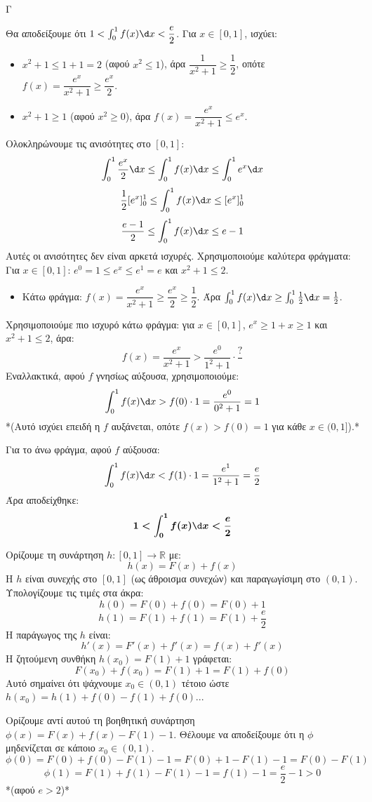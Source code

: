 \begin{thema}{Γ}
\begin{erwthma}
\item Θα αποδείξουμε ότι $1 < \int_0^1 f(x)\d x < \dfrac{e}{2}$.
Για $x \in [0, 1]$, ισχύει:
\begin{itemize}
    \item $x^2 + 1 \le 1 + 1 = 2$ (αφού $x^2 \le 1$), άρα $\dfrac{1}{x^2+1} \ge \dfrac{1}{2}$, οπότε $f(x) = \dfrac{e^x}{x^2+1} \ge \dfrac{e^x}{2}$.
    \item $x^2 + 1 \ge 1$ (αφού $x^2 \ge 0$), άρα $f(x) = \dfrac{e^x}{x^2+1} \le e^x$.
\end{itemize}
Ολοκληρώνουμε τις ανισότητες στο $[0,1]$:
\[ \int_0^1 \frac{e^x}{2} \d x \le \int_0^1 f(x) \d x \le \int_0^1 e^x \d x \]
\[ \frac{1}{2}[e^x]_0^1 \le \int_0^1 f(x) \d x \le [e^x]_0^1 \]
\[ \frac{e-1}{2} \le \int_0^1 f(x) \d x \le e - 1 \]
Αυτές οι ανισότητες δεν είναι αρκετά ισχυρές. Χρησιμοποιούμε καλύτερα φράγματα:
Για $x \in [0,1]$: $e^0 = 1 \le e^x \le e^1 = e$ και $x^2+1 \le 2$.
\begin{itemize}
    \item Κάτω φράγμα: $f(x) = \dfrac{e^x}{x^2+1} \ge \dfrac{e^x}{2} \ge \dfrac{1}{2}$. Άρα $\int_0^1 f(x)\d x \ge \int_0^1 \frac{1}{2}\d x = \frac{1}{2}$.
\end{itemize}
Χρησιμοποιούμε πιο ισχυρό κάτω φράγμα: για $x \in [0,1]$, $e^x \ge 1 + x \ge 1$ και $x^2 + 1 \le 2$, άρα:
\[ f(x) = \frac{e^x}{x^2+1} > \frac{e^0}{1^2+1} \cdot \frac{?}{} \]
Εναλλακτικά, αφού $f$ γνησίως αύξουσα, χρησιμοποιούμε:
\[ \int_0^1 f(x)\d x > f(0) \cdot 1 = \frac{e^0}{0^2+1} = 1 \]
*(Αυτό ισχύει επειδή η $f$ αυξάνεται, οπότε $f(x) > f(0) = 1$ για κάθε $x \in (0,1]$).*

Για το άνω φράγμα, αφού $f$ αύξουσα:
\[ \int_0^1 f(x)\d x < f(1) \cdot 1 = \frac{e^1}{1^2+1} = \frac{e}{2} \]
Άρα αποδείχθηκε:
\[ \boldsymbol{1 < \int_0^1 f(x)\d x < \frac{e}{2}} \]

\item Ορίζουμε τη συνάρτηση $h: [0,1] \to \mathbb{R}$ με:
\[ h(x) = F(x) + f(x) \]
Η $h$ είναι συνεχής στο $[0,1]$ (ως άθροισμα συνεχών) και παραγωγίσιμη στο $(0,1)$.
Υπολογίζουμε τις τιμές στα άκρα:
\[ h(0) = F(0) + f(0) = F(0) + 1 \]
\[ h(1) = F(1) + f(1) = F(1) + \frac{e}{2} \]
Η παράγωγος της $h$ είναι:
\[ h'(x) = F'(x) + f'(x) = f(x) + f'(x) \]
Η ζητούμενη συνθήκη $h(x_0) = F(1) + 1$ γράφεται:
\[ F(x_0) + f(x_0) = F(1) + 1 = F(1) + f(0) \]
Αυτό σημαίνει ότι ψάχνουμε $x_0 \in (0,1)$ τέτοιο ώστε $h(x_0) = h(1) + f(0) - f(1) + f(0)$...

Ορίζουμε αντί αυτού τη βοηθητική συνάρτηση $\phi(x) = F(x) + f(x) - F(1) - 1$.
Θέλουμε να αποδείξουμε ότι η $\phi$ μηδενίζεται σε κάποιο $x_0 \in (0,1)$.
\[ \phi(0) = F(0) + f(0) - F(1) - 1 = F(0) + 1 - F(1) - 1 = F(0) - F(1) \]
\[ \phi(1) = F(1) + f(1) - F(1) - 1 = f(1) - 1 = \frac{e}{2} - 1 > 0 \]
*(αφού $e > 2$)*


\end{erwthma}
\end{thema}
